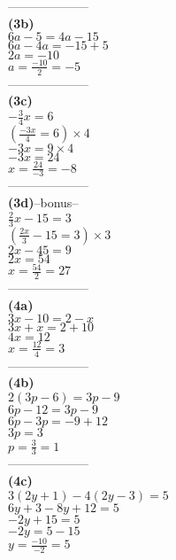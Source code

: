 \documentclass[11pt,a4paper]{article}
\begin{document}
\begin{flushleft}
\begin{minipage}{6cm}
{\color{blue} --------------------}\\
{\bf (3b)}\\
$6a-5=4a-15$\\
$6a-4a=-15+5$\\
$2a=-10$\\
$a=\frac{-10}{2}=-5$\\
{\color{blue} --------------------}\\
{\bf (3c)}\\
$-\frac{3}{4}x=6$\\
$(\frac{-3x}{4}=6)\times 4$\\
$-3x=9\times 4$\\
$-3x=24$\\
$x=\frac{24}{-3}=-8$\\
{\color{blue} --------------------}\\
{\bf (3d)}--bonus--\\
$\frac{2}{3}x-15=3$\\
$(\frac{2x}{3}-15=3)\times 3$\\
$2x-45=9$\\
$2x=54$\\
$x=\frac{54}{2}=27$\\
{\color{blue} --------------------}\\
{\bf (4a)}\\
$3x-10=2-x$\\
$3x+x=2+10$\\
$4x=12$\\
$x=\frac{12}{4}=3$\\
{\color{blue} --------------------}\\
{\bf (4b)}\\
$2(3p-6)=3p-9$\\
$6p-12=3p-9$\\
$6p-3p=-9+12$\\
$3p=3$\\
$p=\frac{3}{3}=1$\\
{\color{blue} --------------------}\\
{\bf (4c)}\\
$3(2y+1)-4(2y-3)=5$\\
$6y+3-8y+12=5$\\
$-2y+15=5$\\
$-2y=5-15$\\
$y=\frac{-10}{-2}=5$\\
\\
\\
\end{minipage}
\begin{minipage}{6cm}

\end{minipage}
\end{flushleft}
\end{document}
